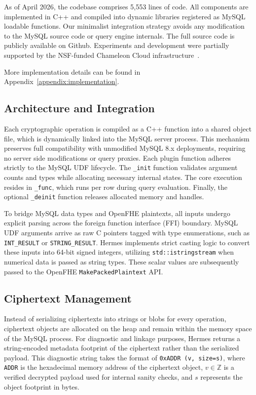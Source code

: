 \documentclass[sigconf,nonacm]{acmart}
\begin{document}
As of April 2026, the codebase comprises 5,553 lines of code. All components are implemented in C++ and compiled into dynamic libraries registered as MySQL loadable functions. Our minimalist integration strategy avoids any modification to the MySQL source code or query engine internals. The full source code is publicly available on Github. Experiments and development were partially supported by the NSF-funded Chameleon Cloud infrastructure~\cite{chameleoncloud}. 

More implementation details can be found in Appendix~\ref{appendix:implementation}.

\subsection{Architecture and Integration}

Each cryptographic operation is compiled as a C++ function into a shared object file, which is dynamically linked into the MySQL server process. This mechanism preserves full compatibility with unmodified MySQL 8.x deployments, requiring no server side modifications or query proxies. Each plugin function adheres strictly to the MySQL UDF lifecycle. The \texttt{\_init} function validates argument counts and types while allocating necessary internal states. The core execution resides in \texttt{\_func}, which runs per row during query evaluation. Finally, the optional \texttt{\_deinit} function releases allocated memory and handles. 

To bridge MySQL data types and OpenFHE plaintexts, all inputs undergo explicit parsing across the foreign function interface (FFI) boundary. MySQL UDF arguments arrive as raw C pointers tagged with type enumerations, such as \texttt{INT\_RESULT} or \texttt{STRING\_RESULT}. Hermes implements strict casting logic to convert these inputs into 64-bit signed integers, utilizing \texttt{std::istringstream} when numerical data is passed as string types. These scalar values are subsequently passed to the OpenFHE \texttt{MakePackedPlaintext} API.

\subsection{Ciphertext Management}

Instead of serializing ciphertexts into strings or blobs for every operation, ciphertext objects are allocated on the heap and remain within the memory space of the MySQL process. For diagnostic and linkage purposes, Hermes returns a string-encoded metadata footprint of the ciphertext rather than the serialized payload. This diagnostic string takes the format of \texttt{0xADDR (v, size=s)}, where \texttt{ADDR} is the hexadecimal memory address of the ciphertext object, $v \in \mathbb{Z}$ is a verified decrypted payload used for internal sanity checks, and $s$ represents the object footprint in bytes.
\end{document}
